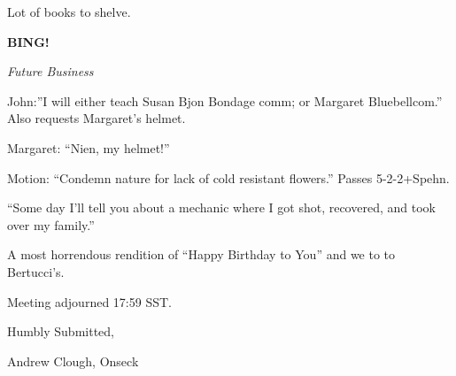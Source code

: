 \documentclass[12pt]{article}
\newcommand{\bing}{{\bf BING!} }
\newcommand{\goto}[1]{\bing \vskip 12pt \centerline{{\em{#1}}}}
\begin{document}
Lot of books to shelve.

\goto{Future Business}

John:''I will either teach Susan Bjon Bondage comm; or Margaret Bluebellcom.''  Also requests Margaret's helmet.

Margaret:  ``Nien, my helmet!''

Motion:  ``Condemn nature for lack of cold resistant flowers.''  Passes 5-2-2+Spehn.

``Some day I'll tell you about a mechanic where I got shot, recovered, and took over my family.''

A most horrendous rendition of ``Happy Birthday to You'' and we to to Bertucci's.

\vspace{12pt}

\noindent
Meeting adjourned 17:59 SST.

\vspace{18pt}

\centerline{Humbly Submitted,}
\centerline{Andrew Clough, Onseck}
\end{document}
